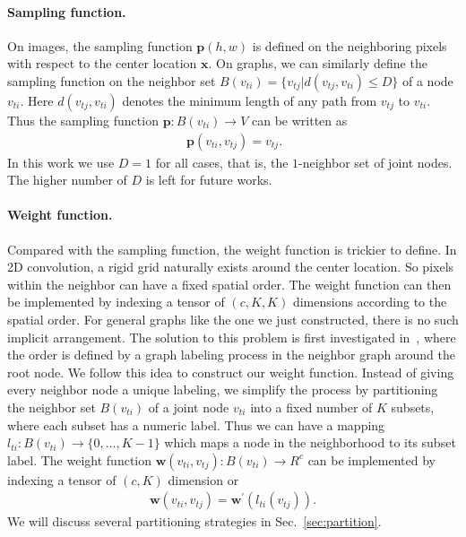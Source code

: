 \documentclass[letterpaper]{article} \usepackage{aaai18}  \usepackage{times}  \usepackage{helvet}  \usepackage{courier}  \usepackage{url}  \usepackage{graphicx}
\begin{document}
\paragraph{Sampling function.} 
On images, the sampling function $\mathbf{p}(h, w)$ is defined on the neighboring pixels with respect to the center location $ \mathbf{x}$. 
On graphs, we can similarly define the sampling function on the neighbor set $ B(v_{ti})=\{v_{tj} | d(v_{tj}, v_{ti}) \leq D \} $ of a node $ v_{ti} $.
Here $ d(v_{tj}, v_{ti}) $ denotes the minimum length of any path from $v_{tj} $ to $ v_{ti} $. 
Thus the sampling function $ \mathbf{p}:B(v_{ti})\rightarrow V $ can be written as
\begin{align}~\label{eq:sampling}
\mathbf{p}(v_{ti}, v_{tj}) = v_{tj}.
\end{align}
In this work we use $ D = 1 $ for all cases, that is, the $ 1 $-neighbor set of joint nodes.
The higher number of $ D $ is left for future works.

\paragraph{Weight function.}
Compared with the sampling function, the weight function is trickier to define.
In 2D convolution, a rigid grid naturally exists around the center location. 
So pixels within the neighbor can have a fixed spatial order. 
The weight function can then be implemented by indexing a tensor of $ (c, K, K) $ dimensions according to the spatial order.
For general graphs like the one we just constructed, there is no such implicit arrangement.
The solution to this problem is first investigated in~\cite{Niepert2016ICML}, where the order is defined by a graph labeling process in the neighbor graph around the root node.
We follow this idea to construct our weight function.
Instead of giving every neighbor node a unique labeling, we simplify the process by partitioning the neighbor set $B(v_{ti})$ of a joint node $ v_{ti} $ into a fixed number of $ K $ subsets, where each subset has a numeric label.
Thus we can have a mapping $ l_{ti}:B(v_{ti})\rightarrow \{0,\ldots,K-1\} $ which maps a node in the neighborhood to its subset label.
The weight function $ \mathbf{w}(v_{ti}, v_{tj}): B(v_{ti})\rightarrow R^c $ can be implemented by indexing a tensor of $ (c, K) $ dimension or
\begin{align}\label{eq:weight}
\mathbf{w}(v_{ti}, v_{tj}) = \mathbf{w}^\prime(l_{ti}(v_{tj})).
\end{align}
We will discuss several partitioning strategies in Sec.~\ref{sec:partition}.
\end{document}
